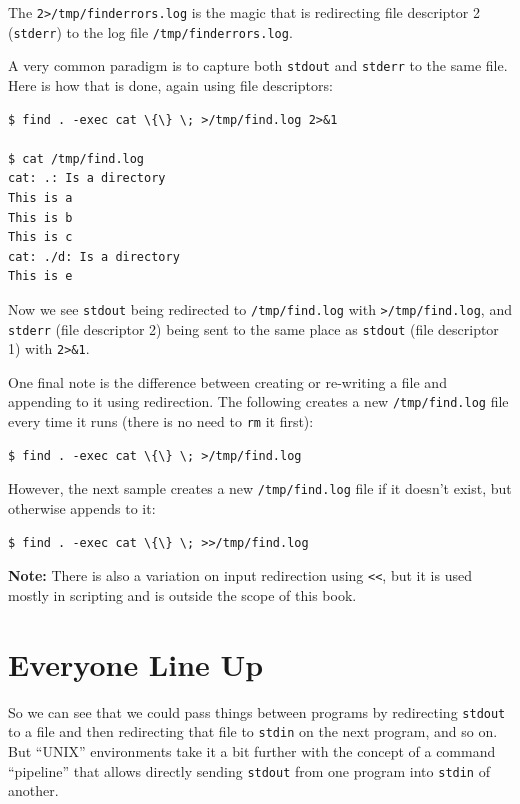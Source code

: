 \documentclass[10pt,]{book}
\numberwithin{figure}{chapter}
\begin{document}
The \texttt{2\textgreater{}/tmp/finderrors.log} is the magic that is
redirecting file descriptor 2 (\texttt{stderr}) to the log file
\texttt{/tmp/finderrors.log}.

A very common paradigm is to capture both \texttt{stdout} and
\texttt{stderr} to the same file. Here is how that is done, again using
file descriptors:

\begin{verbatim}
$ find . -exec cat \{\} \; >/tmp/find.log 2>&1

$ cat /tmp/find.log
cat: .: Is a directory
This is a
This is b
This is c
cat: ./d: Is a directory
This is e
\end{verbatim}

Now we see \texttt{stdout} being redirected to \texttt{/tmp/find.log}
with \texttt{\textgreater{}/tmp/find.log}, and \texttt{stderr} (file
descriptor 2) being sent to the same place as \texttt{stdout} (file
descriptor 1) with \texttt{2\textgreater{}\&1}.

One final note is the difference between creating or re-writing a file
and appending to it using redirection. The following creates a new
\texttt{/tmp/find.log} file every time it runs (there is no need to
\texttt{rm} it first):

\begin{verbatim}
$ find . -exec cat \{\} \; >/tmp/find.log
\end{verbatim}

However, the next sample creates a new \texttt{/tmp/find.log} file if it
doesn't exist, but otherwise appends to it:

\begin{verbatim}
$ find . -exec cat \{\} \; >>/tmp/find.log
\end{verbatim}

\textbf{Note:} There is also a variation on input redirection using
\texttt{\textless{}\textless{}}, but it is used mostly in scripting and
is outside the scope of this book.

\section{Everyone Line Up}\label{everyone-line-up}

So we can see that we could pass things between programs by redirecting
\texttt{stdout} to a file and then redirecting that file to
\texttt{stdin} on the next program, and so on. But ``UNIX'' environments
take it a bit further with the concept of a command ``pipeline'' that
allows directly sending \texttt{stdout} from one program into
\texttt{stdin} of another.
\end{document}
